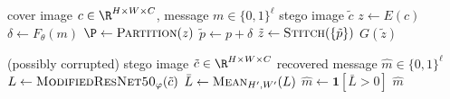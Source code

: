 \documentclass[twocolumn]{article}
\begin{document}
\begin{algorithm}
\caption{Message Encoder $F_\theta$}
\label{alg:encoder}
\begin{algorithmic}[1]
\Require cover image $c \in \R^{H\times W\times C}$, message $m \in \{0,1\}^\ell$
\Ensure stego image $\tilde c$
\State $z \gets E(c)$ 
\State $\delta \gets F_\theta(m)$ 
\State $\P \gets \textproc{Partition}(z)$ 
    \State $\tilde p \gets p + \delta$
\EndFor
\State $\tilde z \gets \textproc{Stitch}(\{\tilde p\})$
\State \Return $G(\tilde z)$
\end{algorithmic}
\end{algorithm}

\begin{algorithm}
\caption{Secret Decoder $D_\varphi$}
\label{alg:decoder}
\begin{algorithmic}[1]
\Require (possibly corrupted) stego image $\tilde c \in \R^{H\times W\times C}$
\Ensure recovered message $\hat m \in \{0,1\}^\ell$
\State $L \gets \textproc{ModifiedResNet50}_\varphi(\tilde c)$ 
\State $\bar L \gets \textproc{Mean}_{H',W'}(L)$
\State $\hat m \gets \mathbf{1}[\bar L > 0]$
\State \Return $\hat m$
\end{algorithmic}
\end{algorithm}
\end{document}

